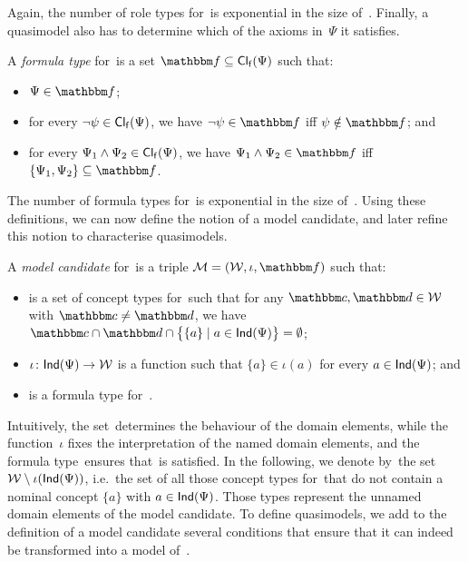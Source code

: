 \noindent
Again, the number of role types for~\Bmc is exponential in the size of~\Bmc.
%
Finally, a quasimodel also has to determine which of the axioms in~$\Psi$ it
satisfies.

\begin{definition}\label{def:formula-type}
    A \emph{formula type} for~\Bmc is a set $\fbb\subseteq\FCl(\Psi)$ such that:
    \begin{itemize}
        \item $\Psi\in\fbb$;
        \item for every $\lnot\psi\in\operatorname{\mathsf{Cl_f}}(\Psi)$, we have $\lnot\psi\in\fbb$ iff
            $\psi\notin\fbb$; and
        \item for every $\Psi_1\land\Psi_2\in\operatorname{\mathsf{Cl_f}}(\Psi)$, we have
            $\Psi_1\land\Psi_2\in\fbb$ iff $\{\Psi_1,\Psi_2\}\subseteq\fbb$.
    \end{itemize}
\end{definition}

\noindent
The number of formula types for~\Bmc is exponential in the size of~\Bmc.
%
Using these definitions, we can now define the notion of a model candidate, and
later refine this notion to characterise quasimodels.

\begin{definition}\label{def:model-candidate}
    A \emph{model candidate} for~\Bmc is a triple $\Mmc=(\Wmc,\iota,\fbb)$ such
    that:
    \begin{itemize}
        \item \Wmc is a set of concept types for~\Bmc such that for any
            $\cbb,\dbb\in\Wmc$ with $\cbb\ne\dbb$, we have
            $\cbb\cap\dbb\cap\bigl\{\{a\}\mid a\in\Ind(\Psi)\bigr\}=\emptyset$;
        \item $\iota\colon\mathsf{Ind}(\Psi)\to\mathcal{W}$ is a function such that
            $\{a\}\in\iota(a)$ for every $a\in\mathsf{Ind}(\Psi)$; and
        \item \fbb is a formula type for~\Bmc.
    \end{itemize}
\end{definition}

\noindent
Intuitively, the set~\Wmc determines the behaviour of the domain elements, while
the function~$\iota$ fixes the interpretation of the named domain elements, and
the formula type~\fbb ensures that~\Bmc is satisfied.
%
In the following, we denote by~\Wmcu the set $\mathcal{W}\setminus\iota(\mathsf{Ind}(\Psi))$,
i.e.~the set of all those concept types for~\Bmc that do not contain a nominal
concept $\{a\}$ with $a\in\mathsf{Ind}(\Psi)$.  Those types represent the unnamed domain
elements of the model candidate.
%
To define quasimodels, we add to the definition of a model candidate several
conditions that ensure that it can indeed be transformed into a model of~\Bmc.

